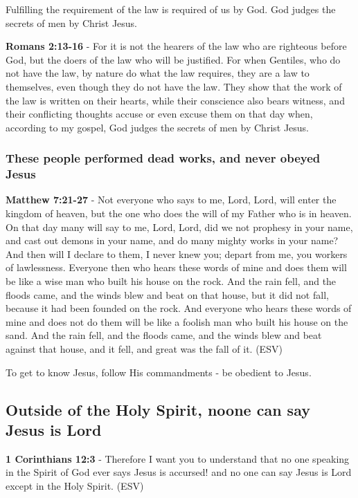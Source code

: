 \documentclass[11pt]{article}
\begin{document}
Fulfilling the requirement of the law is required of us by God. God judges the secrets of men by Christ Jesus.

\textbf{Romans 2:13-16} - For it is not the hearers of the law who are righteous before God, but the doers of the law who will be justified.  For when Gentiles, who do not have the law, by nature do what the law requires, they are a law to themselves, even though they do not have the law.  They show that the work of the law is written on their hearts, while their conscience also bears witness, and their conflicting thoughts accuse or even excuse them on that day when, according to my gospel, God judges the secrets of men by Christ Jesus.

\subsubsection{These people performed dead works, and never obeyed Jesus}
\label{sec:orgaef323e}

\textbf{Matthew 7:21-27} - Not everyone who says to me, Lord, Lord, will enter the kingdom of heaven, but the one who does the will of my Father who is in heaven.  On that day many will say to me, Lord, Lord, did we not prophesy in your name, and cast out demons in your name, and do many mighty works in your name?  And then will I declare to them, I never knew you; depart from me, you workers of lawlessness.  Everyone then who hears these words of mine and does them will be like a wise man who built his house on the rock.  And the rain fell, and the floods came, and the winds blew and beat on that house, but it did not fall, because it had been founded on the rock.  And everyone who hears these words of mine and does not do them will be like a foolish man who built his house on the sand.  And the rain fell, and the floods came, and the winds blew and beat against that house, and it fell, and great was the fall of it. (ESV)

To get to know Jesus, follow His commandments - be obedient to Jesus.

\subsection{Outside of the Holy Spirit, noone can say Jesus is Lord}
\label{sec:orgc665caa}

\textbf{1 Corinthians 12:3} - Therefore I want you to understand that no one speaking in the Spirit of God ever says Jesus is accursed! and no one can say Jesus is Lord except in the Holy Spirit. (ESV)
\end{document}
